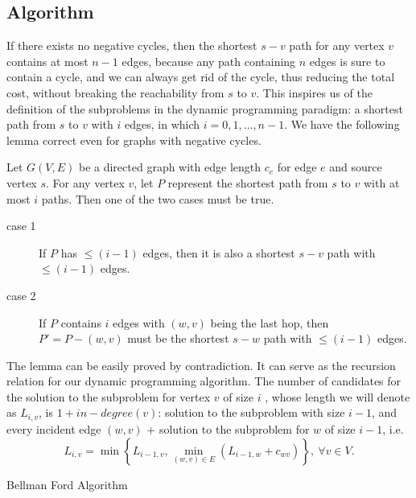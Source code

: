 \subsection{Algorithm}
If there exists no negative cycles, then the shortest $s-v$ path for any vertex $v$ contains at most $n-1$ edges, because any path containing $n$ edges is sure to contain a cycle, and we can always get rid of the cycle, thus reducing the total cost, without breaking the reachability from $s$ to $v$. This inspires us of the definition of the subproblems in the dynamic programming paradigm: a shortest path from $s$ to $v$ with $i$ edges, in which $i=0,1,\dots,n-1$. We have the following lemma correct even for graphs with negative cycles.
\begin{lemma}
Let $G(V,E)$ be a directed graph with edge length $c_e$ for edge $e$ and source vertex $s$. For any vertex $v$, let $P$ represent the shortest path from $s$ to $v$ with at most $i$ paths. Then one of the two cases must be true.
\begin{description}
\item[case 1]If $P$ has $\leq(i-1)$ edges, then it is also a shortest $s-v$ path with $\leq(i-1)$ edges.
\item[case 2]If $P$ contains $i$ edges with $(w,v)$ being the last hop, then $P'=P-(w,v)$ must be the shortest $s-w$ path with $\leq(i-1)$ edges. 
\end{description}
\end{lemma}
The lemma can be easily proved by contradiction. It can serve as the recursion relation for our dynamic programming algorithm. The number of candidates for the solution to the subproblem for vertex $v$ of size $i$ , whose length we will denote as $L_{i,v}$, is $1+in-degree(v)$: solution to the subproblem with size $i-1$, and every incident edge $(w,v)$ + solution to the subproblem for $w$ of size $i-1$, i.e.
\begin{equation*}
L_{i,v} = \min\left\{L_{i-1,v}, \min\limits_{(w,v)\in E}\left(L_{i-1,w}+c_{wv}\right)\right\},\:\forall v\in V.
\end{equation*}
\begin{algorithm}[ht]
\caption{Bellman Ford Algorithm}\label{bellmanford}
\begin{algorithmic}[1]
\EndFor\EndFor
\end{algorithmic}
\end{algorithm}

